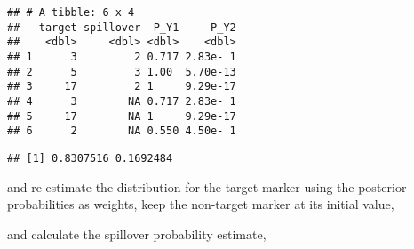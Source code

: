 \documentclass[
]{article}
\newenvironment{Shaded}{\begin{snugshade}}{\end{snugshade}}
\newcommand{\AttributeTok}[1]{\textcolor[rgb]{0.13,0.29,0.53}{#1}}
\newcommand{\FunctionTok}[1]{\textcolor[rgb]{0.13,0.29,0.53}{\textbf{#1}}}
\newcommand{\NormalTok}[1]{#1}
\newcommand{\OtherTok}[1]{\textcolor[rgb]{0.56,0.35,0.01}{#1}}
\newcommand{\SpecialCharTok}[1]{\textcolor[rgb]{0.81,0.36,0.00}{\textbf{#1}}}
\begin{document}
\begin{verbatim}
## # A tibble: 6 x 4
##   target spillover  P_Y1     P_Y2
##    <dbl>     <dbl> <dbl>    <dbl>
## 1      3         2 0.717 2.83e- 1
## 2      5         3 1.00  5.70e-13
## 3     17         2 1     9.29e-17
## 4      3        NA 0.717 2.83e- 1
## 5     17        NA 1     9.29e-17
## 6      2        NA 0.550 4.50e- 1
\end{verbatim}

\begin{Shaded}
\end{Shaded}

\begin{verbatim}
## [1] 0.8307516 0.1692484
\end{verbatim}

and re-estimate the distribution for the target marker using the posterior probabilities as weights, keep the non-target marker at its initial value,

\begin{Shaded}
\end{Shaded}

and calculate the spillover probability estimate,
\end{document}
